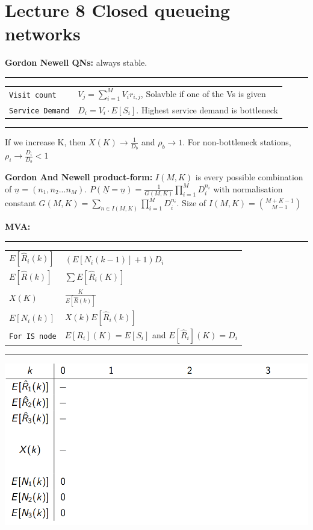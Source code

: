 \section{Lecture 8 Closed queueing networks}
\textbf{Gordon Newell QNs:} always stable.

\hrule
{}
\begin{tabular}{@{}p{\the\MyLen}@{}p{\linewidth-\the\MyLen}@{}}
\verb!Visit count!	&  $V_j = \sum^M_{i=1} V_ir_{i,j}$, Solavble if one of the Vs is given\\
\verb!Service Demand!	&  $D_i = V_i \cdot E[S_i]$. Highest service demand is bottleneck\\
\end{tabular}
\hrule
If we increase K, then $X(K) \rightarrow \frac{1}{D_b}$ and $\rho_b \rightarrow 1$. For non-bottleneck stations, $\rho_i \rightarrow \frac{D_i}{D_b} < 1$

\textbf{Gordon And Newell product-form:} $I(M,K)$ is every possible combination of $\underline{n} = (n_1, n_2 ... n_M)$. $P(\underline{N} = \underline{n}) = \frac{1}{G(M,K)} \prod^M_{i=1} D_i^{n_i}$ with normalisation constant $G(M,K) = \sum_{n \in I(M,K)} \prod_{i=1}^M D_i^{n_i}$. Size of $I(M,K) = {M+K-1 \choose M-1}$

\textbf{MVA:} 

\hrule
{}
\begin{tabular}{@{}p{\the\MyLen}@{}p{\linewidth-\the\MyLen}@{}}
$E[\hat{R}_i(k)]$ 	&  $(E[N_i(k-1)] + 1)D_i$\\
$E[\hat{R}(k)]$ 	&  $\sum E[\hat{R}_i(K)]$\\
$X(K)$ 				&  $\frac{K}{E[\hat{R}(k)]}$\\
$E[N_i(k)]$ 		&  $X(k)E[\hat{R}_i(k)]$\\
\verb!For IS node!  &  $E[R_i](K) = E[S_i]$ and $E[\hat{R}_i](K) = D_i$
\end{tabular}
\newline
\hrule
\includegraphics[scale=0.2]{images/MVA.png}

